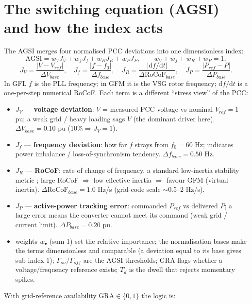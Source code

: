 \documentclass[12pt,a4paper]{article}
\begin{document}
\section{The switching equation (AGSI) and how the index acts}
The AGSI merges four normalised PCC deviations into one dimensionless index:
\begin{equation}
\mathrm{AGSI} = w_V J_V + w_f J_f + w_R J_R + w_P J_P,\qquad w_V+w_f+w_R+w_P=1,
\end{equation}
\begin{equation}
J_V=\frac{|V-V_{ref}|}{\Delta V_{base}},\quad
J_f=\frac{|f-f_0|}{\Delta f_{base}},\quad
J_R=\frac{|\mathrm{d}f/\mathrm{d}t|}{\Delta\mathrm{RoCoF}_{base}},\quad
J_P=\frac{|P_{ref}-P|}{\Delta P_{base}}.
\end{equation}
In GFL $f$ is the PLL frequency; in GFM it is the VSG rotor frequency; $\mathrm{d}f/\mathrm{d}t$ is a
one-per-step numerical RoCoF. Each term is a different ``stress view'' of the PCC:
\begin{itemize}\itemsep2pt
\item $J_V$ --- \textbf{voltage deviation}: $V$ = measured PCC voltage vs nominal $V_{ref}=1$ pu; a weak
grid / heavy loading sags $V$ (the dominant driver here). $\Delta V_{base}=0.10$ pu ($10\%\Rightarrow J_V=1$).
\item $J_f$ --- \textbf{frequency deviation}: how far $f$ strays from $f_0=60$ Hz; indicates power
imbalance / loss-of-synchronism tendency. $\Delta f_{base}=0.50$ Hz.
\item $J_R$ --- \textbf{RoCoF}: rate of change of frequency, a standard low-inertia stability metric
\cite{entsoe_rocof2}; large RoCoF $\Rightarrow$ low effective inertia $\Rightarrow$ favour GFM (virtual
inertia). $\Delta\mathrm{RoCoF}_{base}=1.0$ Hz/s (grid-code scale $\sim$0.5--2 Hz/s).
\item $J_P$ --- \textbf{active-power tracking error}: commanded $P_{ref}$ vs delivered $P$; a large error
means the converter cannot meet its command (weak grid / current limit). $\Delta P_{base}=0.20$ pu.
\item weights $w_\bullet$ (sum 1) set the relative importance; the normalisation bases make the terms
dimensionless and comparable (a deviation equal to its base gives sub-index 1); $\Gamma_{on}/\Gamma_{off}$
are the AGSI thresholds; $\mathrm{GRA}$ flags whether a voltage/frequency reference exists; $T_d$ is the
dwell that rejects momentary spikes.
\end{itemize}
With grid-reference availability $\mathrm{GRA}\in\{0,1\}$ the logic is:
\end{document}
